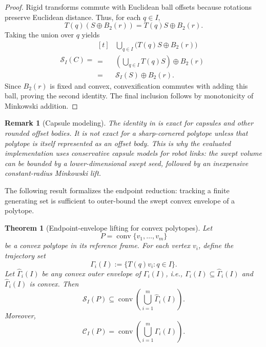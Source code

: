 \documentclass[journal]{IEEEtran}
\newtheorem{theorem}{Theorem}
\newtheorem{remark}{Remark}
\begin{document}
\begin{proof}
Rigid transforms commute with Euclidean ball offsets because rotations preserve
Euclidean distance. Thus, for each $q \in I$,
\[
T(q)(S \oplus B_2(r)) = T(q)S \oplus B_2(r).
\]
Taking the union over $q$ yields
\[
\mathcal{S}_I(C)
= \begin{aligned}[t]
&\bigcup_{q\in I} \bigl(T(q)S \oplus B_2(r)\bigr) \\
=\;&\left(\bigcup_{q\in I} T(q)S\right) \oplus B_2(r) \\
=\;&\mathcal{S}_I(S) \oplus B_2(r).
\end{aligned}
\]
Since $B_2(r)$ is fixed and convex, convexification commutes with adding this
ball, proving the second identity. The final inclusion follows by monotonicity
of Minkowski addition.
\end{proof}

\begin{remark}[Capsule modeling]\label{rem:capsule_exact}
The identity in  is exact for capsules and other rounded
offset bodies. It is not exact for a sharp-cornered polytope unless that
polytope is itself represented as an offset body. This is why the evaluated
implementation uses conservative capsule models for robot links: the swept
volume can be bounded by a lower-dimensional swept seed, followed by an
inexpensive constant-radius Minkowski lift.
\end{remark}

The following result formalizes the endpoint reduction: tracking a finite
generating set is sufficient to outer-bound the swept convex envelope of a
polytope.

\begin{theorem}[Endpoint-envelope lifting for convex polytopes]
\label{thm:vertex_lift}
Let
\[
P = \operatorname{conv}\{v_1,\dots,v_m\}
\]
be a convex polytope in its reference frame. For each vertex $v_i$, define the
trajectory set
\[
\Gamma_i(I) := \{T(q)v_i : q\in I\}.
\]
Let $\widehat{\Gamma}_i(I)$ be any convex outer envelope of $\Gamma_i(I)$, i.e.,
$\Gamma_i(I) \subseteq \widehat{\Gamma}_i(I)$ and
$\widehat{\Gamma}_i(I)$ is convex. Then
\[
\mathcal{S}_I(P)
\subseteq
\operatorname{conv}\left(\bigcup_{i=1}^m \widehat{\Gamma}_i(I)\right).
\]
Moreover,
\[
\mathcal{C}_I(P)
= \operatorname{conv}\left(\bigcup_{i=1}^m \Gamma_i(I)\right).
\]
\end{theorem}
\end{document}
